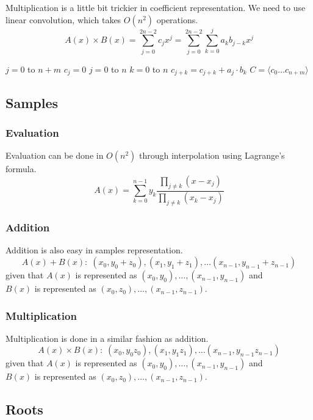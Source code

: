 Multiplication is a little bit trickier in coefficient representation. We need to use linear convolution, which takes $O(n^2)$ operations.
$$
A(x) \times B(x) = \sum_{j=0}^{2n-2} c_j x^j = \sum_{j=0}^{2n-2} \sum_{k=0}^j a_k b_{j-k} x^j
$$
\begin{codebox}
    \li \For $j = 0$ to $n+m$ \Do
        \li $c_j = 0$
    \End
    \li \For $j = 0$ to $n$ \Do
        \li \For $k = 0$ to $n$ \Do
            \li $c_{j+k} = c_{j+k} + a_j \cdot b_k$
        \End
    \End
    \li $C = \langle c_0 \ldots c_{n+m} \rangle$
\end{codebox}

\subsection{Samples}

\subsubsection{Evaluation}

Evaluation can be done in $O(n^2)$ through interpolation using Lagrange's formula.
$$
A(x) = \sum_{k=0}^{n-1} y_k \frac{\prod_{j\neq k} (x-x_j)}{\prod_{j \neq k} (x_k - x_j)}
$$

\subsubsection{Addition}

Addition is also easy in samples representation.
$$
A(x) + B(x):\; (x_0,y_0+z_0),(x_1,y_1+z_1),\ldots (x_{n-1},y_{n-1}+z_{n-1})
$$
given that $A(x)$ is represented as $(x_0,y_0),\ldots,(x_{n-1},y_{n-1})$ and \\ $B(x)$ is represented as $(x_0,z_0),\ldots,(x_{n-1},z_{n-1})$.

\subsubsection{Multiplication}

Multiplication is done in a similar fashion as addition.
$$
A(x) \times B(x):\; (x_0,y_0z_0),(x_1,y_1z_1),\ldots (x_{n-1},y_{n-1}z_{n-1})
$$
given that $A(x)$ is represented as $(x_0,y_0),\ldots,(x_{n-1},y_{n-1})$ and \\ $B(x)$ is represented as $(x_0,z_0),\ldots,(x_{n-1},z_{n-1})$.

\subsection{Roots}
